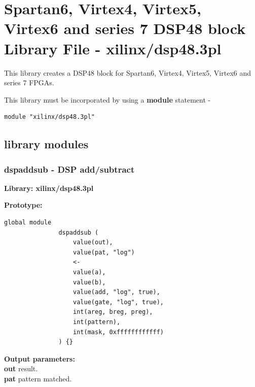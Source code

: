 \pagebreak

\section{Spartan6, Virtex4, Virtex5, Virtex6 and series 7 DSP48 block Library File - xilinx/dsp48.3pl}

    This library creates a DSP48 block for Spartan6, Virtex4, Virtex5, Virtex6
    and series 7 FPGAs.
    
    This library must be incorporated by using a {\bf module} statement -
    \begin{lstlisting}[gobble=4, language=threepl]
       module "xilinx/dsp48.3pl"
    \end{lstlisting}



    \subsection{library modules}

        \subsubsection{dspaddsub - DSP add/subtract}\label{sec:lmdspaddsub}

            {\bf Library: xilinx/dsp48.3pl}

            {\bf Prototype:} \\
            \vsp
            \begin{lstlisting}[gobble=12, language=threepl]
               global module
               dspaddsub (
                   value(out),
                   value(pat, "log")
                   <-
                   value(a),
                   value(b),
                   value(add, "log", true),
                   value(gate, "log", true),
                   int(areg, breg, preg),
                   int(pattern),
                   int(mask, 0xffffffffffff)
               ) {}
            \end{lstlisting}

            {\bf Output parameters:} \\
            {\bf out} result.\\
            {\bf pat} pattern matched.\\


